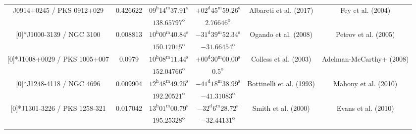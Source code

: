 \begin{landscape}
\begin{longtable}{cccccc}
  \multirow{2}[0]{*}{J0914+0245 / PKS 0912+029} & \multirow{2}[0]{*}{0.426622} &  
    $09^\text{h}14^\text{m}37.91^\text{s}$  & $+02^\text{d}45^\text{m}59.26^\text{s}$  & 
    \multirow{2}[0]{*}{Albareti et al. (2017) \cite{RedRef9_2017}}& \multirow{2}[0]{*}{Fey et al. (2004) \cite{CoordRef2_2004}} \\*
    & & $ 138.65797 ^\text{o}$ & $ 2.76646 ^\text{o}$ & & \\ \addlinespace 


  \multirow{2}[0]{*}{J1000-3139 / NGC 3100} & \multirow{2}[0]{*}{0.008813} &  
    $10^\text{h}00^\text{m}40.84^\text{s} $  & $ -31^\text{d}39^\text{m}52.34^\text{s} $  & 
    \multirow{2}[0]{*}{Ogando et al. (2008) \cite{RedRef35_2008}}& \multirow{2}[0]{*}{Petrov et al. (2005) \cite{CoordRef35_2005}} \\*
    & & $150.17015^\text{o}$ & $-31.66454^\text{o}$ & & \\ \addlinespace 

  \multirow{2}[0]{*}{J1008+0029 / PKS 1005+007} & \multirow{2}[0]{*}{0.0979} &  
    $ 10^\text{h}08^\text{m}11.44^\text{s}$  & $+00^\text{d}30^\text{m}00.00^\text{s}$  & 
    \multirow{2}[0]{*}{Colless et al. (2003) \cite{RedRef36_2003}}& \multirow{2}[0]{*}{Adelman-McCarthy+ (2008) \cite{CoordRef28_2008}} \\*
    & & $152.04766^\text{o}$ & $0.5^\text{o}$ & & \\ \addlinespace 
 
  \multirow{2}[0]{*}{J1248-4118 / NGC 4696} & \multirow{2}[0]{*}{0.009904} &  
    $12^\text{h}48^\text{m}49.25^\text{s}$  & $-41^\text{d}18^\text{m}38.99^\text{s}$  & 
    \multirow{2}[0]{*}{Bottinelli et al. (1993)\cite{RedRef1_1993}}& \multirow{2}[0]{*}{Mahony et al. (2010)\cite{CoordRef51_2010}} \\*
    & & $192.20521^\text{o}$ & $-41.31083^\text{o}$ & & \\ \addlinespace 

  \multirow{2}[0]{*}{J1301-3226 / PKS 1258-321} & \multirow{2}[0]{*}{0.017042} &  
    $13^\text{h}01^\text{m}00.79^\text{s}$  & $-32^\text{d}6^\text{m}28.72^\text{s}$  & 
    \multirow{2}[0]{*}{Smith et al. (2000)\cite{RedRef52_2000}}& \multirow{2}[0]{*}{Evans et al. (2010)\cite{CoordRef1_2010}} \\*
    & & $195.25328^\text{o}$ & $-32.44131^\text{o}$ & & \\ \addlinespace 



\end{longtable}
\end{landscape}
